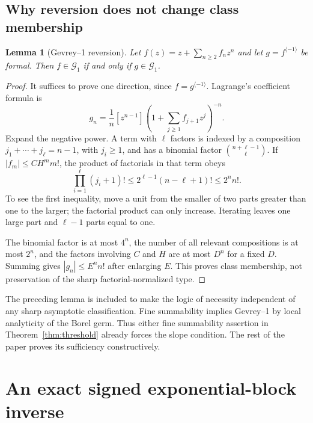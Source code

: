 \documentclass[11pt,a4paper]{article}
\numberwithin{equation}{section}
\newtheorem{lemma}[theorem]{Lemma}
\theoremstyle{definition}
\theoremstyle{remark}
\newcommand{\G}{\mathcal G_1}
\newcommand{\inv}{\langle-1\rangle}
\newcommand{\coeff}[2]{[#1^{#2}]}
\begin{document}
\subsection{Why reversion does not change class membership}
\begin{lemma}[Gevrey--1 reversion]
\label{lem:gevreyinverse}
Let $f(z)=z+\sum_{n\ge2}f_nz^n$ and let $g=f^{\inv}$ be formal.
Then $f\in\G$ if and only if $g\in\G$.
\end{lemma}
\begin{proof}
It suffices to prove one direction, since $f=g^{\inv}$.  Lagrange's
coefficient formula is
\[
 g_n=\frac1n\coeff{z}{n-1}
       \left(1+\sum_{j\ge1}f_{j+1}z^j\right)^{-n}.
\]
Expand the negative power.  A term with $\ell$ factors is indexed by a
composition $j_1+\cdots+j_\ell=n-1$, with $j_i\ge1$, and has a binomial
factor $\binom{n+\ell-1}{\ell}$.  If
$|f_m|\le CH^m m!$, the product of factorials in that term obeys
\begin{equation}
 \prod_{i=1}^{\ell}(j_i+1)!
 \le 2^{\ell-1}(n-\ell+1)!\le 2^n n!.
 \label{eq:factorial-product}
\end{equation}
To see the first inequality, move a unit from the smaller of two parts
greater than one to the larger; the factorial product can only increase.
Iterating leaves one large part and $\ell-1$ parts equal to one.

The binomial factor is at most $4^n$, the number of all relevant
compositions is at most $2^n$, and the factors involving $C$ and $H$ are
at most $D^n$ for a fixed $D$.  Summing gives $|g_n|\le E^n n!$ after
enlarging $E$.  This proves class membership, not preservation of the
sharp factorial-normalized type.
\end{proof}

The preceding lemma is included to make the logic of necessity independent
of any sharp asymptotic classification.  Fine summability implies Gevrey--1
by local analyticity of the Borel germ.  Thus either fine summability
assertion in Theorem~\ref{thm:threshold} already forces the slope condition.
The rest of the paper proves its sufficiency constructively.

\section{An exact signed exponential-block inverse}
\label{sec:blocks}
\end{document}
